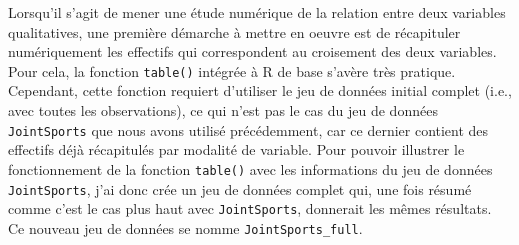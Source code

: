 \documentclass[
  letterpaper,
]{book}
\begin{document}
Lorsqu'il s'agit de mener une étude numérique de la relation entre deux
variables qualitatives, une première démarche à mettre en oeuvre est de
récapituler numériquement les effectifs qui correspondent au croisement
des deux variables. Pour cela, la fonction \texttt{table()} intégrée à R
de base s'avère très pratique. Cependant, cette fonction requiert
d'utiliser le jeu de données initial complet (i.e., avec toutes les
observations), ce qui n'est pas le cas du jeu de données
\texttt{JointSports} que nous avons utilisé précédemment, car ce dernier
contient des effectifs déjà récapitulés par modalité de variable. Pour
pouvoir illustrer le fonctionnement de la fonction \texttt{table()} avec
les informations du jeu de données \texttt{JointSports}, j'ai donc crée
un jeu de données complet qui, une fois résumé comme c'est le cas plus
haut avec \texttt{JointSports}, donnerait les mêmes résultats. Ce
nouveau jeu de données se nomme \texttt{JointSports\_full}.
\end{document}
